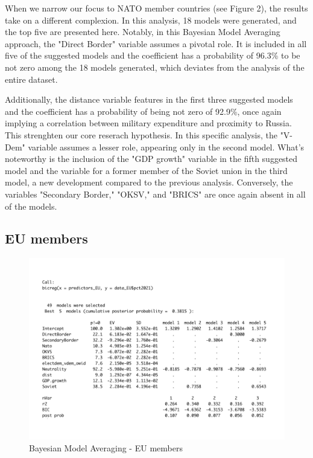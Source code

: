 \documentclass[12pt,a4paper]{article}
\begin{document}
When we narrow our focus to NATO member countries (see Figure 2), the results take on a different complexion. In this analysis, 18 models were generated, and the top five are presented here. Notably, in this Bayesian Model Averaging approach, the "Direct Border" variable assumes a pivotal role. It is included in all five of the suggested models and the coefficient has a probability of 96.3\% to be not zero among the 18 models generated, which deviates from the analysis of the entire dataset.

Additionally, the distance variable features in the first three suggested models and the coefficient has a probability of being not zero of 92.9\%, once again implying a correlation between military expenditure and proximity to Russia. This strenghten our core reserach hypothesis. In this specific analysis, the "V-Dem" variable assumes a lesser role, appearing only in the second model. What's noteworthy is the inclusion of the "GDP growth" variable in the fifth suggested model and the variable for a former member of the Soviet union in the third model, a new development compared to the previous analysis. Conversely, the variables "Secondary Border," "OKSV," and "BRICS" are once again absent in all of the models. \\


\subsection{EU members}
\begin{figure}[h]
\center
\label{F:1}
\includegraphics[scale=0.5]{BMA_EU}
\caption{Bayesian Model Averaging - EU members}
\end{figure}
\end{document}
